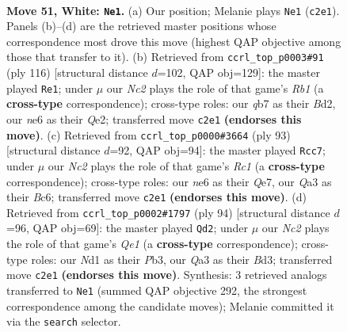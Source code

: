 \documentclass[11pt]{article}
\begin{document}
\clearpage

\begin{figure}[p]\centering
\begin{subfigure}{0.46\textwidth}\centering
\resizebox{\linewidth}{!}{%
\newchessgame
\chessboard[
  setfen={nr6/1q5k/p2bnr2/P1p2p1p/3p1Pp1/QP4P1/1RNBP2P/2RN2K1 w - - 18 51},
  showmover=false,
  pgfstyle=straightmove, color=movearrow, markmove={c2-e1}
]}
\caption{}
\end{subfigure}\hfill
\begin{subfigure}{0.46\textwidth}\centering
\resizebox{\linewidth}{!}{%
\newchessgame
\chessboard[
  setfen={6r1/p1r2pq1/kp2p2p/3nP2P/b1pNR1P1/P1P4K/2PBQ3/1R6 w - - 31 59},
  showmover=false,
  pgfstyle=straightmove, color=movearrow, markmove={b1-e1}
]}
\caption{}
\end{subfigure}
\\[4pt]
\begin{subfigure}{0.46\textwidth}\centering
\resizebox{\linewidth}{!}{%
\newchessgame
\chessboard[
  setfen={2r3k1/3rqp2/1pbpn1p1/7p/1PP1Pp1P/1BQR1N2/5PP1/4R1K1 b - - 24 47},
  showmover=false,
  pgfstyle=straightmove, color=movearrow, markmove={c8-c7}
]}
\caption{}
\end{subfigure}\hfill
\begin{subfigure}{0.46\textwidth}\centering
\resizebox{\linewidth}{!}{%
\newchessgame
\chessboard[
  setfen={1r2r1k1/p2b1n2/P1p2qp1/2Pp1p1p/1p3P2/1P1BPN1P/4R1P1/2R1Q2K w - - 25 48},
  showmover=false,
  pgfstyle=straightmove, color=movearrow, markmove={e1-d2}
]}
\caption{}
\end{subfigure}
\caption{\textbf{Move 51, White: \texttt{Ne1}.} (a) Our position; Melanie plays \texttt{Ne1} (\texttt{c2e1}). Panels (b)--(d) are the retrieved master positions whose correspondence most drove this move (highest QAP objective among those that transfer to it). (b) Retrieved from \texttt{ccrl\_top\_p0003\#91} (ply 116) [structural distance $d$=102, QAP obj=129]: the master played \texttt{Re1}; under $\mu$ our \emph{Nc2} plays the role of that game's \emph{Rb1} (a \textbf{cross-type} correspondence); cross-type roles: our \emph{q}b7 as their \emph{B}d2, our \emph{n}e6 as their \emph{Q}e2; transferred move \texttt{c2e1} \textbf{(endorses this move)}. (c) Retrieved from \texttt{ccrl\_top\_p0000\#3664} (ply 93) [structural distance $d$=92, QAP obj=94]: the master played \texttt{Rcc7}; under $\mu$ our \emph{Nc2} plays the role of that game's \emph{Rc1} (a \textbf{cross-type} correspondence); cross-type roles: our \emph{n}e6 as their \emph{Q}e7, our \emph{Q}a3 as their \emph{B}c6; transferred move \texttt{c2e1} \textbf{(endorses this move)}. (d) Retrieved from \texttt{ccrl\_top\_p0002\#1797} (ply 94) [structural distance $d$=96, QAP obj=69]: the master played \texttt{Qd2}; under $\mu$ our \emph{Nc2} plays the role of that game's \emph{Qe1} (a \textbf{cross-type} correspondence); cross-type roles: our \emph{N}d1 as their \emph{P}b3, our \emph{Q}a3 as their \emph{B}d3; transferred move \texttt{c2e1} \textbf{(endorses this move)}. Synthesis: 3 retrieved analogs transferred to \texttt{Ne1} (summed QAP objective 292, the strongest correspondence among the candidate moves); Melanie committed it via the \texttt{search} selector.}
\label{fig:thought-m100}
\end{figure}
\end{document}
